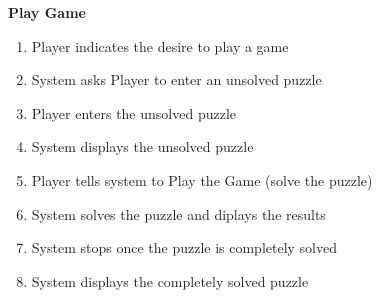 \documentclass[letterpaper]{article}
\begin{document}
\noindent
\textbf{Play Game}
\begin{enumerate}
\item Player indicates the desire to play a game
\item System asks Player to enter an unsolved puzzle
\item Player enters the unsolved puzzle
\item System displays the unsolved puzzle
\item Player tells system to Play the Game (solve the puzzle)
\item System solves the puzzle and diplays the results
\item System stops once the puzzle is completely solved
\item System displays the completely solved puzzle
\end{enumerate}
\end{document}
